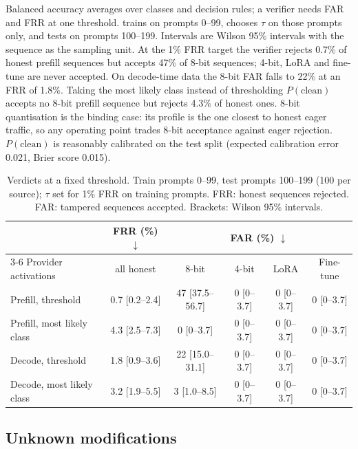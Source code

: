 \documentclass[11pt]{article}
\newcommand{\down}{$\downarrow$}
\newcommand{\ci}[2]{{\scriptsize[#1--#2]}}
\begin{document}
Balanced accuracy averages over classes and decision rules; a verifier needs FAR and FRR at one threshold.
 trains on prompts 0--99, chooses $\tau$ on those prompts only, and tests on prompts 100--199.
Intervals are Wilson 95\% intervals with the sequence as the sampling unit.
At the 1\% FRR target the verifier rejects 0.7\% of honest prefill sequences but accepts 47\% of 8-bit sequences; 4-bit, LoRA and fine-tune are never accepted.
On decode-time data the 8-bit FAR falls to 22\% at an FRR of 1.8\%.
Taking the most likely class instead of thresholding $P(\text{clean})$ accepts no 8-bit prefill sequence but rejects 4.3\% of honest ones.
8-bit quantisation is the binding case: its profile is the one closest to honest eager traffic, so any operating point trades 8-bit acceptance against eager rejection.
$P(\text{clean})$ is reasonably calibrated on the test split (expected calibration error 0.021, Brier score 0.015).

\begin{table}[!htb]
\centering
\small
\caption{Verdicts at a fixed threshold. Train prompts 0--99, test prompts 100--199 (100 per source); $\tau$ set for 1\% FRR on training prompts. FRR: honest sequences rejected. FAR: tampered sequences accepted. Brackets: Wilson 95\% intervals.}
\label{tab:op}
\begin{tabular}{@{}lccccc@{}}
\toprule
 & FRR (\%) \down & \multicolumn{4}{c}{FAR (\%) \down} \\
\cmidrule(l){3-6}
Provider activations & all honest & 8-bit & 4-bit & LoRA & Fine-tune \\
\midrule
Prefill, threshold   & 0.7 \ci{0.2}{2.4} & 47 \ci{37.5}{56.7} & 0 \ci{0}{3.7} & 0 \ci{0}{3.7} & 0 \ci{0}{3.7} \\
Prefill, most likely class & 4.3 \ci{2.5}{7.3} & 0 \ci{0}{3.7} & 0 \ci{0}{3.7} & 0 \ci{0}{3.7} & 0 \ci{0}{3.7} \\
Decode, threshold    & 1.8 \ci{0.9}{3.6} & 22 \ci{15.0}{31.1} & 0 \ci{0}{3.7} & 0 \ci{0}{3.7} & 0 \ci{0}{3.7} \\
Decode, most likely class & 3.2 \ci{1.9}{5.5} & 3 \ci{1.0}{8.5} & 0 \ci{0}{3.7} & 0 \ci{0}{3.7} & 0 \ci{0}{3.7} \\
\bottomrule
\end{tabular}
\end{table}

\subsection{Unknown modifications}
\label{sec:res-open}
\end{document}
